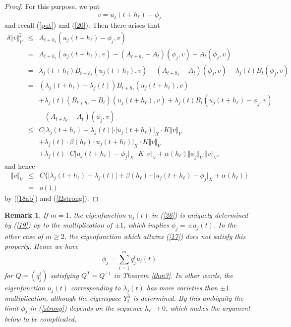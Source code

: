 \documentclass[final,a4paper]{jmsj}
\theoremstyle{thmstyleone}%
\theoremstyle{thmstyletwo}%
\newtheorem{remark}{Remark}%
\theoremstyle{thmstylethree}%
\begin{document}
\begin{proof}
For this purpose, we put  
\[ v=u_j(t+h_\ell)-\phi_j \] 
and recall (\ref{put}) and (\ref{20}). Then there arises that  
\begin{eqnarray*} 
\delta \Vert v\Vert_V^2 & \leq & A_{t+h_\ell}(u_j(t+h_\ell)-\phi_j, v) \nonumber\\ 
& = & A_{t+h_\ell}(u_j(t+h_\ell), v) - (A_{t+h_\ell}-A_{t})(\phi_j, v)-A_{t}(\phi_j, v) \nonumber\\ 
& = & \lambda_j(t+h_\ell)B_{t+h_\ell}(u_j(t+h_\ell), v) - (A_{t+h_\ell}-A_{t})(\phi_j,v) -\lambda_j(t)B_{t}(\phi_j, v) \nonumber\\ 
& = & (\lambda_j(t+h_\ell)-\lambda_j(t))B_{t+h_\ell}(u_j(t+h_\ell),v) \nonumber\\ 
& & +\lambda_j(t)(B_{t+h_\ell}-B_{t})(u_j(t+h_\ell),v) +\lambda_j(t)B_{t}(u_j(t+h_\ell)-\phi_j,v) \nonumber\\ 
& & -(A_{t+h_\ell}-A_{t})(\phi_j, v) \nonumber\\  
& \leq &  C\vert \lambda_j(t+h_\ell)-\lambda_j(t)\vert \cdot \vert u_j(t+h_\ell)\vert_X\cdot K\Vert v\Vert_V \nonumber\\ 
& & + \lambda_j(t)\cdot \beta(h_\ell)\cdot \vert u_j(t+h_\ell)\vert_X\cdot K\Vert v\Vert_V \nonumber\\ 
& & +\lambda_j(t)\cdot C\vert u_j(t+h_\ell)-\phi_j\vert_X\cdot K\Vert v\Vert_V +\alpha(h_\ell)\Vert \phi_j\Vert_V\cdot \Vert v\Vert_V, 
\end{eqnarray*} 
and hence 
\begin{eqnarray*} 
\Vert v \Vert_V & \leq & C\{ \vert \lambda_j(t+h_\ell)-\lambda_j(t)\vert +\beta(h_\ell)+\vert u_j(t+h_\ell)-\phi_j\vert_X +\alpha(h_\ell)\} \\ 
& =& o(1) 
\end{eqnarray*}
by (\ref{18ab}) and (\ref{l2strong}).  
\end{proof} 

\begin{remark}\label{ambiguity} 
If $m=1$, the eigenfunction $u_j(t)$ in (\ref{26}) is uniquely determined by (\ref{19}) up to the multiplication of $\pm 1$, which implies $\phi_j=\pm u_j(t)$. In the other case of $m\geq 2$, the eigenfunction which attains (\ref{17}) does not satisfy this property. Hence we have   
\[ \phi_j=\sum_{i=1}^mq^i_ju_i(t) \] 
for $Q=(q^i_j)$ satisfying $Q^{T}=Q^{-1}$ in Theorem \ref{thm3}. In other words, the eigenfunction $u_j(t)$ corresponding to $\lambda_j(t)$ has more varieties than $\pm 1$ multiplication, although the eigenspace $Y_t^\lambda$ is determined. By this ambiguity the limit $\phi_j$ in (\ref{strong}) depends on the sequence $h_\ell\rightarrow 0$, which makes the argument below to be complicated. 
\end{remark} 
\end{document}
